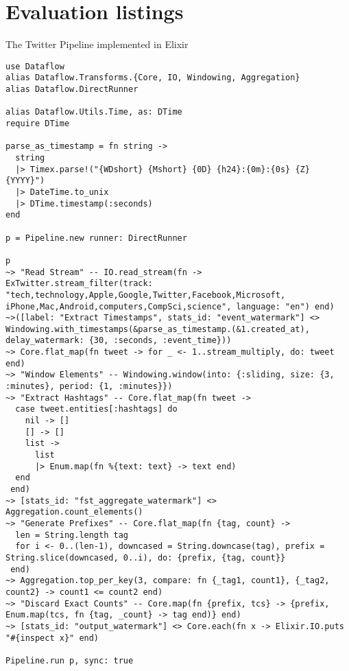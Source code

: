 \chapter{Evaluation listings}\label{apx:twitter-code}

\begin{codelisting}
\caption{The Twitter Pipeline implemented in Elixir}
\label{lst:apxb:twitter-elixir}
\begin{verbatim}
use Dataflow
alias Dataflow.Transforms.{Core, IO, Windowing, Aggregation}
alias Dataflow.DirectRunner

alias Dataflow.Utils.Time, as: DTime
require DTime

parse_as_timestamp = fn string ->
  string
  |> Timex.parse!("{WDshort} {Mshort} {0D} {h24}:{0m}:{0s} {Z} {YYYY}")
  |> DateTime.to_unix
  |> DTime.timestamp(:seconds)
end

p = Pipeline.new runner: DirectRunner

p
~> "Read Stream" -- IO.read_stream(fn -> ExTwitter.stream_filter(track: "tech,technology,Apple,Google,Twitter,Facebook,Microsoft,
iPhone,Mac,Android,computers,CompSci,science", language: "en") end)
~>([label: "Extract Timestamps", stats_id: "event_watermark"] <> Windowing.with_timestamps(&parse_as_timestamp.(&1.created_at), delay_watermark: {30, :seconds, :event_time}))
~> Core.flat_map(fn tweet -> for _ <- 1..stream_multiply, do: tweet end)
~> "Window Elements" -- Windowing.window(into: {:sliding, size: {3, :minutes}, period: {1, :minutes}})
~> "Extract Hashtags" -- Core.flat_map(fn tweet ->
  case tweet.entities[:hashtags] do
    nil -> []
    [] -> []
    list ->
      list
      |> Enum.map(fn %{text: text} -> text end)
  end
 end)
~> [stats_id: "fst_aggregate_watermark"] <> Aggregation.count_elements()
~> "Generate Prefixes" -- Core.flat_map(fn {tag, count} ->
  len = String.length tag
  for i <- 0..(len-1), downcased = String.downcase(tag), prefix = String.slice(downcased, 0..i), do: {prefix, {tag, count}}
 end)
~> Aggregation.top_per_key(3, compare: fn {_tag1, count1}, {_tag2, count2} -> count1 <= count2 end)
~> "Discard Exact Counts" -- Core.map(fn {prefix, tcs} -> {prefix, Enum.map(tcs, fn {tag, _count} -> tag end)} end)
~> [stats_id: "output_watermark"] <> Core.each(fn x -> Elixir.IO.puts "#{inspect x}" end)

Pipeline.run p, sync: true
\end{verbatim}
\end{codelisting}
\newpage
